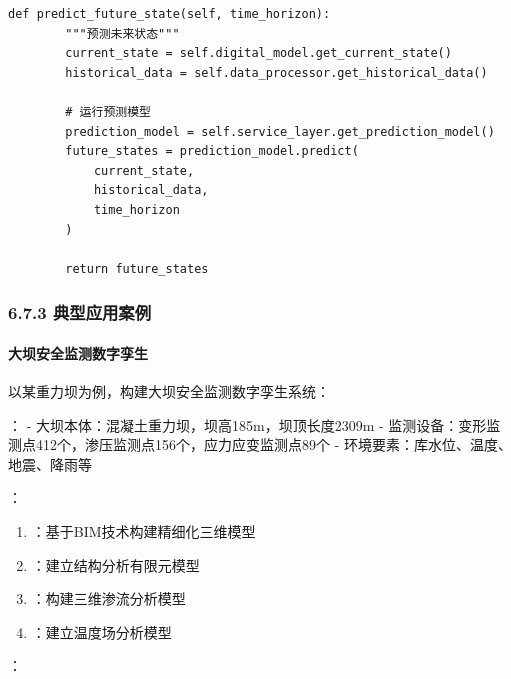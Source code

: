 \begin{lstlisting}[style=python]
    def predict_future_state(self, time_horizon):
        """预测未来状态"""
        current_state = self.digital_model.get_current_state()
        historical_data = self.data_processor.get_historical_data()
        
        # 运行预测模型
        prediction_model = self.service_layer.get_prediction_model()
        future_states = prediction_model.predict(
            current_state, 
            historical_data, 
            time_horizon
        )
        
        return future_states
\end{lstlisting}

\hypertarget{ux5178ux578bux5e94ux7528ux6848ux4f8b}{%
\subsubsection{6.7.3 典型应用案例}\label{ux5178ux578bux5e94ux7528ux6848ux4f8b}}

\hypertarget{ux5927ux575dux5b89ux5168ux76d1ux6d4bux6570ux5b57ux5b6aux751f}{%
\paragraph{大坝安全监测数字孪生}\label{ux5927ux575dux5b89ux5168ux76d1ux6d4bux6570ux5b57ux5b6aux751f}}

以某重力坝为例，构建大坝安全监测数字孪生系统：

： - 大坝本体：混凝土重力坝，坝高185m，坝顶长度2309m - 监测设备：变形监测点412个，渗压监测点156个，应力应变监测点89个 - 环境要素：库水位、温度、地震、降雨等

：

\begin{enumerate}
\def\labelenumi{\arabic{enumi}.}
\tightlist
\item
  ：基于BIM技术构建精细化三维模型
\item
  ：建立结构分析有限元模型
\item
  ：构建三维渗流分析模型
\item
  ：建立温度场分析模型
\end{enumerate}

：

